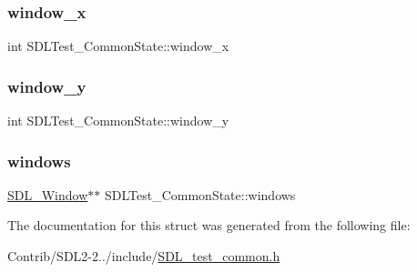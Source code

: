 \subsubsection{\texorpdfstring{window\+\_\+x}{window\_x}}
{\footnotesize\ttfamily int S\+D\+L\+Test\+\_\+\+Common\+State\+::window\+\_\+x}

\mbox{\label{struct_s_d_l_test___common_state_a1fcd61cbe37c2bb563e7b2f1c6853d29}} 
\subsubsection{\texorpdfstring{window\+\_\+y}{window\_y}}
{\footnotesize\ttfamily int S\+D\+L\+Test\+\_\+\+Common\+State\+::window\+\_\+y}

\mbox{\label{struct_s_d_l_test___common_state_a0a054f0c45eb9d21f9561d701e721106}} 
\subsubsection{\texorpdfstring{windows}{windows}}
{\footnotesize\ttfamily \mbox{\hyperlink{_s_d_l__video_8h_a55a196c7d3b8497538632c79ae1e6392}{S\+D\+L\+\_\+\+Window}}$\ast$$\ast$ S\+D\+L\+Test\+\_\+\+Common\+State\+::windows}



The documentation for this struct was generated from the following file\+:\begin{DoxyCompactItemize}
\item 
Contrib/\+S\+D\+L2-\/2../include/\mbox{\hyperlink{_s_d_l__test__common_8h}{S\+D\+L\+\_\+test\+\_\+common.\+h}}\end{DoxyCompactItemize}
